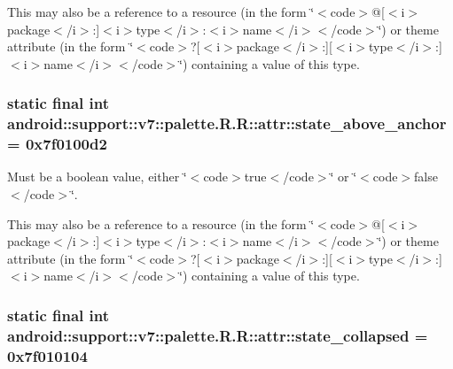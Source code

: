 This may also be a reference to a resource (in the form \char`\"{}$<$code$>$@\mbox{[}$<$i$>$package$<$/i$>$:\mbox{]}$<$i$>$type$<$/i$>$:$<$i$>$name$<$/i$>$$<$/code$>$\char`\"{}) or theme attribute (in the form \char`\"{}$<$code$>$?\mbox{[}$<$i$>$package$<$/i$>$:\mbox{]}\mbox{[}$<$i$>$type$<$/i$>$:\mbox{]}$<$i$>$name$<$/i$>$$<$/code$>$\char`\"{}) containing a value of this type. \hypertarget{classandroid_1_1support_1_1v7_1_1palette_1_1_r_1_1attr_2e8adfa2c885c7eea0d8ae12a4f2b0c4}{
\subsubsection[{state\_\-above\_\-anchor}]{\setlength{\rightskip}{0pt plus 5cm}static final int android::support::v7::palette.R.R::attr::state\_\-above\_\-anchor = 0x7f0100d2}}
\label{classandroid_1_1support_1_1v7_1_1palette_1_1_r_1_1attr_2e8adfa2c885c7eea0d8ae12a4f2b0c4}


Must be a boolean value, either \char`\"{}$<$code$>$true$<$/code$>$\char`\"{} or \char`\"{}$<$code$>$false$<$/code$>$\char`\"{}. 

This may also be a reference to a resource (in the form \char`\"{}$<$code$>$@\mbox{[}$<$i$>$package$<$/i$>$:\mbox{]}$<$i$>$type$<$/i$>$:$<$i$>$name$<$/i$>$$<$/code$>$\char`\"{}) or theme attribute (in the form \char`\"{}$<$code$>$?\mbox{[}$<$i$>$package$<$/i$>$:\mbox{]}\mbox{[}$<$i$>$type$<$/i$>$:\mbox{]}$<$i$>$name$<$/i$>$$<$/code$>$\char`\"{}) containing a value of this type. \hypertarget{classandroid_1_1support_1_1v7_1_1palette_1_1_r_1_1attr_cf7c262e5dd00bf960f08b3afe01f03e}{
\subsubsection[{state\_\-collapsed}]{\setlength{\rightskip}{0pt plus 5cm}static final int android::support::v7::palette.R.R::attr::state\_\-collapsed = 0x7f010104}}
\label{classandroid_1_1support_1_1v7_1_1palette_1_1_r_1_1attr_cf7c262e5dd00bf960f08b3afe01f03e}


